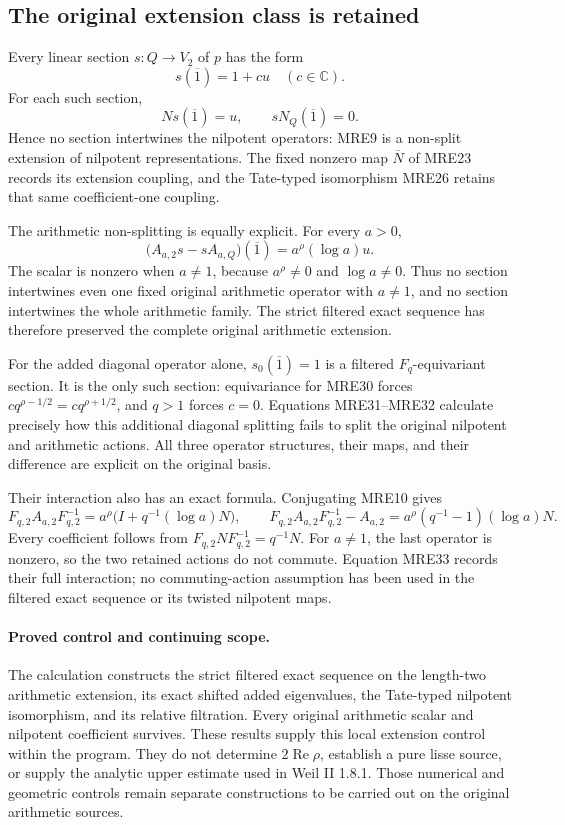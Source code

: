 \documentclass[11pt,a4paper]{article}
\begin{document}
\subsection{The original extension class is retained}

Every linear section \(s:Q\to V_2\) of \(p\) has the form
\[
 s(\overline{1})=1+c u\quad(c\in\mathbb C).
 \tag{MRE30}
\]
For each such section,
\[
 Ns(\overline{1})=u,\qquad sN_Q(\overline{1})=0.
 \tag{MRE31}
\]
Hence no section intertwines the nilpotent operators: MRE9 is a
non-split extension of nilpotent representations. The fixed nonzero map
\(\overline N\) of MRE23 records its extension coupling, and the
Tate-typed isomorphism MRE26 retains that same coefficient-one coupling.

The arithmetic non-splitting is equally explicit. For every \(a>0\),
\[
 \bigl(A_{a,2}s-sA_{a,Q}\bigr)(\overline{1})
       =a^\rho(\log a)u.
 \tag{MRE32}
\]
The scalar is nonzero when \(a\ne1\), because \(a^\rho\ne0\) and
\(\log a\ne0\). Thus no section intertwines even one fixed original
arithmetic operator with \(a\ne1\), and no section intertwines the
whole arithmetic family. The strict filtered exact sequence has
therefore preserved the complete original arithmetic extension.

For the added diagonal operator alone, \(s_0(\overline{1})=1\) is a
filtered \(F_q\)-equivariant section. It is the only such section:
equivariance for MRE30 forces
\(c q^{\rho-1/2}=c q^{\rho+1/2}\), and \(q>1\) forces \(c=0\).
Equations MRE31--MRE32 calculate precisely how this additional
diagonal splitting fails to split the original nilpotent and arithmetic
actions. All three operator structures, their maps, and their difference
are explicit on the original basis.

Their interaction also has an exact formula. Conjugating MRE10 gives
\[
 F_{q,2}A_{a,2}F_{q,2}^{-1}
   =a^\rho\bigl(I+q^{-1}(\log a)N\bigr),\qquad
 F_{q,2}A_{a,2}F_{q,2}^{-1}-A_{a,2}
   =a^\rho(q^{-1}-1)(\log a)N.
 \tag{MRE33}
\]
Every coefficient follows from \(F_{q,2}NF_{q,2}^{-1}=q^{-1}N\).
For \(a\ne1\), the last operator is nonzero, so the two retained
actions do not commute. Equation MRE33 records their full interaction;
no commuting-action assumption has been used in the filtered exact
sequence or its twisted nilpotent maps.

\paragraph{Proved control and continuing scope.}
The calculation constructs the strict filtered exact sequence on the
length-two arithmetic extension, its exact shifted added eigenvalues,
the Tate-typed nilpotent isomorphism, and its relative filtration.
Every original arithmetic scalar and nilpotent coefficient survives.
These results supply this local extension control within the program.
They do not determine \(2\operatorname{Re}\rho\), establish a pure lisse
source, or supply the analytic upper estimate used in Weil II 1.8.1.
Those numerical and geometric controls remain separate constructions
to be carried out on the original arithmetic sources.
\end{document}
